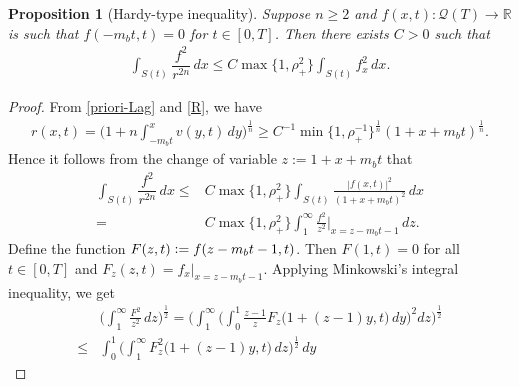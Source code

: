 \documentclass[a4paper,12pt,draft]{article}
\newtheorem{proposition}[theorem]{Proposition}
\theoremstyle{remark}
\def\R{\mathbb{R}}
\def\mQ{\mathcal{Q}}
\begin{document}
\begin{proposition}[Hardy-type inequality] \label{prop:hardy}
    Suppose $n\ge 2$ and $f(x,t): \mQ(T)\to \R$ is such that $f(-m_bt,t)=0$ for $t\in[0,T]$. Then there exists $C>0$ such that
    \begin{align*}
        \int_{S(t)} \dfrac{f^2}{r^{2n}} \, dx
        \le C \max\{1,\rho_{+}^2\} \int_{S(t)} f_x^2 \, dx.
    \end{align*}
\end{proposition}
\begin{proof}
    From \eqref{priori-Lag} and \eqref{R}, we have
    \begin{align*}
        r(x,t) = \Big( 1+ n \int_{-m_b t}^x v(y,t)\, dy \Big)^{\frac{1}{n}} %
        \ge C^{-1} \min\{1,\rho_{+}^{-1}\}^{\frac{1}{n}} (1+ x + m_b t)^{\frac{1}{n}}.
    \end{align*}
    Hence it follows from the change of variable $z:= 1+x+m_b t$ that
    \begin{align}
        \int_{S(t)} \dfrac{f^2}{r^{2n}} \, dx \le& C \max\{1,\rho_{+}^2\}\int_{S(t)} \frac{|f(x,t)|^2}{(1+x+m_b t)^{2}} \, dx\nonumber\\
        =& C\max\{1,\rho_{+}^2\}\int_{1}^{\infty} \frac{f^2}{z^2}\Big\vert_{x=z-m_bt-1} \, dz. \label{temp:minkow}
    \end{align}
    Define the function $F(z,t)\vcentcolon= f(z-m_b t-1,t)$. Then $F(1,t)=0$ for all $t\in[0,T]$ and $F_{z}(z,t) = f_x \vert_{x=z-m_b t-1}$. Applying Minkowski's integral inequality, we get
    \begin{align*}
        &\bigg(\int_{1}^{\infty} \frac{F^2}{z^2} \, d z \bigg)^{\frac{1}{2}}
        =\bigg(\int_{1}^{\infty}\!\!\bigg(\int_{0}^{1}\! \frac{z-1}{z} F_{z}\big( 1+(z-1)y,t\big)\, dy  \bigg)^2 d z\bigg)^{\frac{1}{2}}\\
         \le & \int_{0}^1 \bigg( \int_{1}^{\infty} \!  F_z^2 \big( 1+(z-1)y , t \big)\, dz \bigg)^{\frac{1}{2}}\, d y

\end{align*}
\end{proof}
\end{document}
